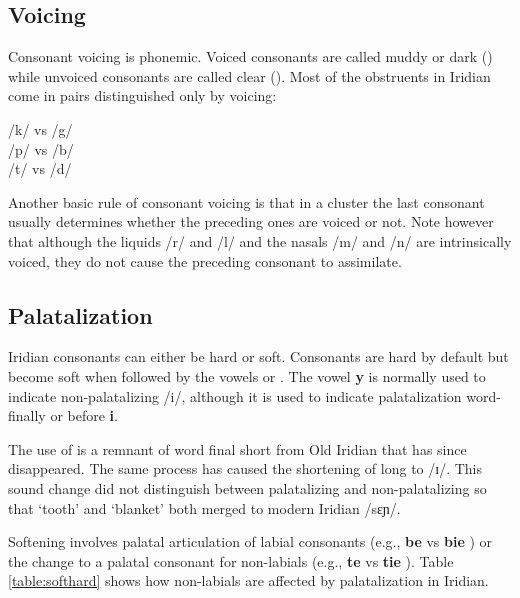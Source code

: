 \subsection{Voicing}
Consonant voicing is phonemic. Voiced consonants are called muddy or dark () while unvoiced consonants are called clear (). Most of the obstruents in Iridian come in pairs distinguished only by voicing:

\pex
\a /k/  vs /g/ \\
\a /p/  vs /b/ \\
\a /t/  vs /d/ 
\xe

Another basic rule of consonant voicing is that in a cluster the last consonant usually determines whether the preceding ones are voiced or not. Note however that although the liquids /r/ and /l/ and the nasals /m/ and /n/ are intrinsically voiced, they do not cause the preceding consonant to assimilate.

\ex
{}
\xe

\subsection{Palatalization}
\par Iridian consonants can either be hard or soft. Consonants are hard by default but become soft when followed by the vowels  or . The vowel \textbf{y} is normally used to indicate non-palatalizing /i/, although it is used to indicate palatalization word-finally or before \textbf{i}.

\par The use of  is a remnant of word final short  from Old Iridian that has since disappeared. The same process has caused the shortening of long  to /ɪ/. This sound change did not distinguish between palatalizing and non-palatalizing  so that  `tooth' and  `blanket' both merged to modern Iridian  /sɛɲ/.

\par Softening involves palatal articulation of labial consonants (e.g., \textbf{be} \textipa{[bE]} vs \textbf{bie} \textipa{[b\sx{j}E]}) or the change to a palatal consonant for non-labials (e.g., \textbf{te} \textipa{[tE]} vs \textbf{tie} \textipa{[cE]}). Table \ref{table:softhard} shows how non-labials are affected by palatalization in Iridian.

